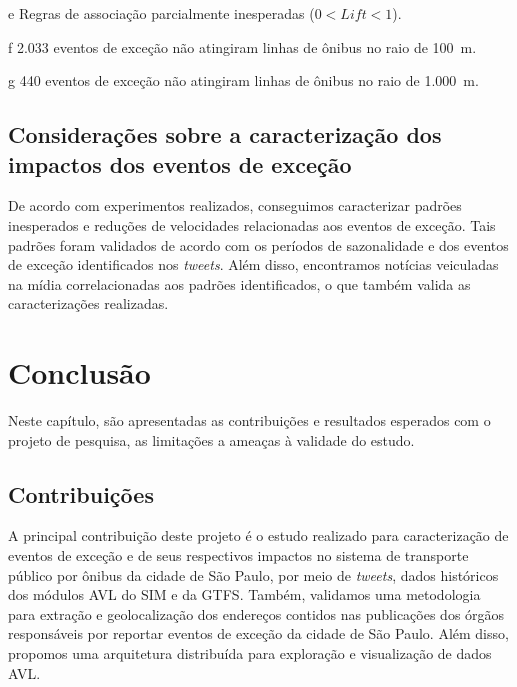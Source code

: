 \documentclass[
	12pt,				%
	oneside,			%
	a4paper,			%
	english,			%
	brazil				%
	]{abntex2ppgsi}
\begin{document}
{{\begin{table}[!htb]
\begin{threeparttable}
\begin{tablenotes}
            \item[e] Regras de associação parcialmente inesperadas ($0 < Lift < 1$).
            \item[f] 2.033 eventos de exceção não atingiram linhas de ônibus no raio de 100~m.
            \item[g] 440 eventos de exceção não atingiram linhas de ônibus no raio de 1.000~m.
        \end{tablenotes}
\end{threeparttable}
\end{table}

\clearpage

\section{Considerações sobre a caracterização dos impactos dos eventos de exceção}

De acordo com experimentos realizados, conseguimos caracterizar padrões inesperados e reduções de velocidades relacionadas aos eventos de exceção. Tais padrões foram validados de acordo com os períodos de sazonalidade e dos eventos de exceção identificados nos \textit{tweets}. Além disso, encontramos notícias veiculadas na mídia correlacionadas aos padrões identificados, o que também valida as caracterizações realizadas.

\chapter{Conclusão}
\label{conclusion}

Neste capítulo, são apresentadas as contribuições e resultados esperados com o projeto de pesquisa, as limitações a ameaças à validade do estudo. 

\section{Contribuições}

A principal contribuição deste projeto é o estudo realizado para caracterização de eventos de exceção e de seus respectivos impactos no sistema de transporte público por ônibus da cidade de São Paulo, por meio de \textit{tweets}, dados históricos dos módulos AVL do SIM e da GTFS. %
Também, validamos uma metodologia para extração e geolocalização dos endereços contidos nas publicações dos órgãos responsáveis por reportar eventos de exceção da cidade de São Paulo. Além disso, propomos uma arquitetura distribuída para exploração e visualização de dados AVL.

}}
\end{document}
